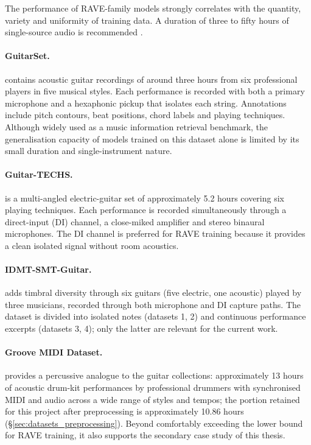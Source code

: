 \documentclass[a4paper,11pt,oneside,openany]{book}
\begin{document}
The performance of RAVE-family models strongly correlates with the quantity, variety and uniformity of training data. A duration of three to fifty hours of single-source audio is recommended \parencite{caillon2021rave}.

\paragraph{GuitarSet.} \parencite{xi2018guitarset} contains acoustic guitar recordings of around three hours from six professional players in five musical styles. Each performance is recorded with both a primary microphone and a hexaphonic pickup that isolates each string. Annotations include pitch contours, beat positions, chord labels and playing techniques. Although widely used as a music information retrieval benchmark, the generalisation capacity of models trained on this dataset alone is limited by its small duration and single-instrument nature.

\paragraph{Guitar-TECHS.} \parencite{pedroza2024guitartechs} is a multi-angled electric-guitar set of approximately 5.2 hours covering six playing techniques. Each performance is recorded simultaneously through a direct-input (DI) channel, a close-miked amplifier and stereo binaural microphones. The DI channel is preferred for RAVE training because it provides a clean isolated signal without room acoustics.

\paragraph{IDMT-SMT-Guitar.} \parencite{kehling2014idmt} adds timbral diversity through six guitars (five electric, one acoustic) played by three musicians, recorded through both microphone and DI capture paths. The dataset is divided into isolated notes (datasets 1, 2) and continuous performance excerpts (datasets 3, 4); only the latter are relevant for the current work.

\paragraph{Groove MIDI Dataset.} \parencite{gillick2019groove} provides a percussive analogue to the guitar collections: approximately 13 hours of acoustic drum-kit performances by professional drummers with synchronised MIDI and audio across a wide range of styles and tempos; the portion retained for this project after preprocessing is approximately 10.86 hours (\S\ref{sec:datasets_preprocessing}). Beyond comfortably exceeding the lower bound for RAVE training, it also supports the secondary case study of this thesis.
\end{document}
